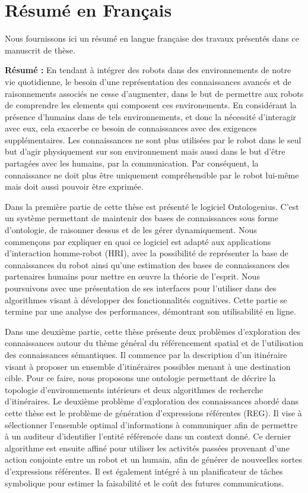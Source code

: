 \chapter{Résumé en Français}
\label{app:fr_small}

Nous fournissons ici un résumé en langue française des travaux présentés dans ce manuscrit de thèse.

\textbf{Résumé :}
En tendant à intégrer des robots dans des environnements de notre vie quotidienne, le besoin d'une représentation des connaissances avancés et de raisonnements associés ne cesse d'augmenter, dans le but de permettre aux robots de comprendre les elements qui composent ces environements. En considérant la présence d'humains dans de tels environnements, et donc la nécessité d'interagir avec eux, cela exacerbe ce besoin de connaissances avec des exigences supplémentaires. Les connaissances ne sont plus utilisées par le robot dans le seul but d'agir physiquement sur son environnement mais aussi dans le but d'être partagées avec les humains, par la communication. Par conséquent, la connaissance ne doit plus être uniquement compréhensible par le robot lui-même mais doit aussi pouvoir être exprimée. %

Dans la première partie de cette thèse est présenté le logiciel Ontologenius. C'est un système permettant de maintenir des bases de connaissances sous forme d'ontologie, de raisonner dessus et de les gérer dynamiquement. Nous commençons par expliquer en quoi ce logiciel est adapté aux applications d'interaction homme-robot (HRI), avec la possibilité de représenter la base de connaissances du robot ainsi qu'une estimation des bases de connaissances des partenaires humains pour mettre en œuvre la théorie de l'esprit. Nous poursuivons avec une présentation de ses interfaces pour l'utiliser dans des algorithmes visant à développer des fonctionnalités cognitives. Cette partie se termine par une analyse des performances, démontrant son utilisabilité en ligne. %

Dans une deuxième partie, cette thèse présente deux problèmes d'exploration des connaissances autour du thème général du référencement spatial et de l'utilisation des connaissances sémantiques. Il commence par la description d'un itinéraire visant à proposer un ensemble d'itinéraires possibles menant à une destination cible. Pour ce faire, nous proposons une ontologie permettant de décrire la topologie d'environnements intérieurs et deux algorithmes de recherche d'itinéraires. Le deuxième problème d'exploration des connaissances abordé dans cette thèse est le problème de génération d'expressions référentes (REG). Il vise à sélectionner l'ensemble optimal d'informations à communiquer afin de permettre à un auditeur d'identifier l'entité référencée dans un context donné. Ce dernier algorithme est ensuite affiné pour utiliser les activités passées provenant d'une action conjointe entre un robot et un humain, afin de générer de nouveelles sortes d'expressions référentes. Il est également intégré à un planificateur de tâches symbolique pour estimer la faisabilité et le coût des futures communications. %

